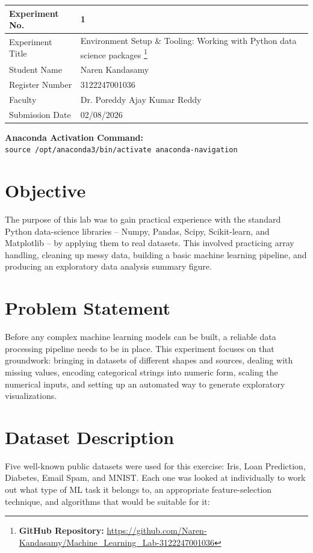 \documentclass[12pt,a4paper]{article}
\begin{document}
\begin{tabular}{|p{4cm}|p{11cm}|}
\hline
Experiment No. & 1 \\ \hline
Experiment Title & Environment Setup \& Tooling: Working with Python data science packages
\footnote{\textbf{GitHub Repository: }\url{https://github.com/Naren-Kandasamy/Machine_Learning_Lab-3122247001036}}\\ \hline
Student Name & Naren Kandasamy \\ \hline
Register Number & 3122247001036 \\ \hline
Faculty & Dr. Poreddy Ajay Kumar Reddy \\ \hline
Submission Date & 02/08/2026 \\ \hline
\end{tabular}

\vspace{0.5cm}
\noindent\textbf{Anaconda Activation Command:} \\
\texttt{source /opt/anaconda3/bin/activate anaconda-navigation}

\section{Objective}
The purpose of this lab was to gain practical experience with the standard Python data-science libraries -- Numpy, Pandas, Scipy, Scikit-learn, and Matplotlib -- by applying them to real datasets. This involved practicing array handling, cleaning up messy data, building a basic machine learning pipeline, and producing an exploratory data analysis summary figure.

\section{Problem Statement}
Before any complex machine learning models can be built, a reliable data processing pipeline needs to be in place. This experiment focuses on that groundwork: bringing in datasets of different shapes and sources, dealing with missing values, encoding categorical strings into numeric form, scaling the numerical inputs, and setting up an automated way to generate exploratory visualizations.

\section{Dataset Description}
Five well-known public datasets were used for this exercise: Iris, Loan Prediction, Diabetes, Email Spam, and MNIST. Each one was looked at individually to work out what type of ML task it belongs to, an appropriate feature-selection technique, and algorithms that would be suitable for it:
\end{document}
